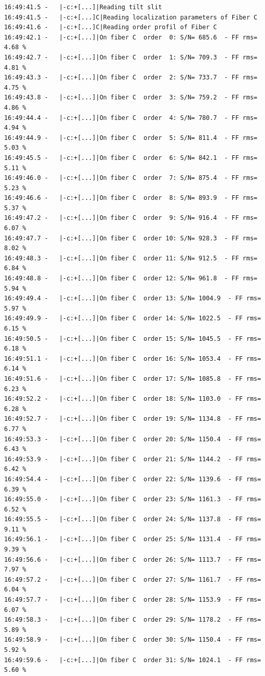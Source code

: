 \begin{lstlisting}[style=text]
16:49:41.5 -   |-c:+[...]|Reading tilt slit 
16:49:41.5 -   |-c:+[...]C|Reading localization parameters of Fiber C
16:49:41.6 -   |-c:+[...]C|Reading order profil of Fiber C
16:49:42.1 -   |-c:+[...]|On fiber C  order  0: S/N= 685.6  - FF rms= 4.68 %
16:49:42.7 -   |-c:+[...]|On fiber C  order  1: S/N= 709.3  - FF rms= 4.81 %
16:49:43.3 -   |-c:+[...]|On fiber C  order  2: S/N= 733.7  - FF rms= 4.75 %
16:49:43.8 -   |-c:+[...]|On fiber C  order  3: S/N= 759.2  - FF rms= 4.86 %
16:49:44.4 -   |-c:+[...]|On fiber C  order  4: S/N= 780.7  - FF rms= 4.94 %
16:49:44.9 -   |-c:+[...]|On fiber C  order  5: S/N= 811.4  - FF rms= 5.03 %
16:49:45.5 -   |-c:+[...]|On fiber C  order  6: S/N= 842.1  - FF rms= 5.11 %
16:49:46.0 -   |-c:+[...]|On fiber C  order  7: S/N= 875.4  - FF rms= 5.23 %
16:49:46.6 -   |-c:+[...]|On fiber C  order  8: S/N= 893.9  - FF rms= 5.37 %
16:49:47.2 -   |-c:+[...]|On fiber C  order  9: S/N= 916.4  - FF rms= 6.07 %
16:49:47.7 -   |-c:+[...]|On fiber C  order 10: S/N= 928.3  - FF rms= 8.02 %
16:49:48.3 -   |-c:+[...]|On fiber C  order 11: S/N= 912.5  - FF rms= 6.84 %
16:49:48.8 -   |-c:+[...]|On fiber C  order 12: S/N= 961.8  - FF rms= 5.94 %
16:49:49.4 -   |-c:+[...]|On fiber C  order 13: S/N= 1004.9  - FF rms= 5.97 %
16:49:49.9 -   |-c:+[...]|On fiber C  order 14: S/N= 1022.5  - FF rms= 6.15 %
16:49:50.5 -   |-c:+[...]|On fiber C  order 15: S/N= 1045.5  - FF rms= 6.18 %
16:49:51.1 -   |-c:+[...]|On fiber C  order 16: S/N= 1053.4  - FF rms= 6.14 %
16:49:51.6 -   |-c:+[...]|On fiber C  order 17: S/N= 1085.8  - FF rms= 6.23 %
16:49:52.2 -   |-c:+[...]|On fiber C  order 18: S/N= 1103.0  - FF rms= 6.28 %
16:49:52.7 -   |-c:+[...]|On fiber C  order 19: S/N= 1134.8  - FF rms= 6.77 %
16:49:53.3 -   |-c:+[...]|On fiber C  order 20: S/N= 1150.4  - FF rms= 6.43 %
16:49:53.9 -   |-c:+[...]|On fiber C  order 21: S/N= 1144.2  - FF rms= 6.42 %
16:49:54.4 -   |-c:+[...]|On fiber C  order 22: S/N= 1139.6  - FF rms= 6.39 %
16:49:55.0 -   |-c:+[...]|On fiber C  order 23: S/N= 1161.3  - FF rms= 6.52 %
16:49:55.5 -   |-c:+[...]|On fiber C  order 24: S/N= 1137.8  - FF rms= 9.11 %
16:49:56.1 -   |-c:+[...]|On fiber C  order 25: S/N= 1131.4  - FF rms= 9.39 %
16:49:56.6 -   |-c:+[...]|On fiber C  order 26: S/N= 1113.7  - FF rms= 7.97 %
16:49:57.2 -   |-c:+[...]|On fiber C  order 27: S/N= 1161.7  - FF rms= 6.04 %
16:49:57.7 -   |-c:+[...]|On fiber C  order 28: S/N= 1153.9  - FF rms= 6.07 %
16:49:58.3 -   |-c:+[...]|On fiber C  order 29: S/N= 1178.2  - FF rms= 5.89 %
16:49:58.9 -   |-c:+[...]|On fiber C  order 30: S/N= 1150.4  - FF rms= 5.92 %
16:49:59.6 -   |-c:+[...]|On fiber C  order 31: S/N= 1024.1  - FF rms= 5.60 %

\end{lstlisting}
